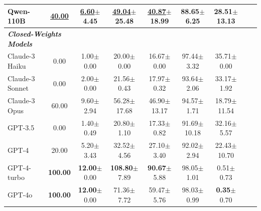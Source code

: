 \documentclass{article}
\begin{document}
\begin{table}[h]
\begin{tabular}{lcccccccc}
Qwen-110B & \underline{40.00} & \underline{6.60}\tiny{$\pm$4.45} & \underline{49.04}\tiny{$\pm$25.48} & \underline{40.87}\tiny{$\pm$18.99} & 88.65\tiny{$\pm$6.25} & 28.51\tiny{$\pm$13.13} \\
\midrule
\multicolumn{2}{l}{\textbf{\textit{Closed-Weights Models}}} & \\
Claude-3 Haiku & 0.00 & 1.00\tiny{$\pm$0.00} & 20.00\tiny{$\pm$0.00} & 16.67\tiny{$\pm$0.00} & 97.44\tiny{$\pm$3.32} & 35.71\tiny{$\pm$0.00} \\
Claude-3 Sonnet & 0.00 & 2.00\tiny{$\pm$0.00} & 21.56\tiny{$\pm$0.43} & 17.97\tiny{$\pm$0.32} & 93.64\tiny{$\pm$2.06} & 33.17\tiny{$\pm$1.92} \\
Claude-3 Opus & 60.00 & 9.60\tiny{$\pm$2.94} & 56.28\tiny{$\pm$17.68} & 46.90\tiny{$\pm$13.17} & 94.57\tiny{$\pm$1.71} & 18.79\tiny{$\pm$11.54} \\
GPT-3.5 & 0.00 & 1.40\tiny{$\pm$0.49} & 20.80\tiny{$\pm$1.10} & 17.33\tiny{$\pm$0.82} & 91.69\tiny{$\pm$10.18} & 32.16\tiny{$\pm$5.57} \\
GPT-4 & 20.00 & 5.20\tiny{$\pm$3.43} & 32.52\tiny{$\pm$4.56} & 27.10\tiny{$\pm$3.40} & 92.02\tiny{$\pm$2.94} & 22.43\tiny{$\pm$10.70} \\
GPT-4-turbo & \textbf{100.00} & \textbf{12.00}\tiny{$\pm$0.00} & \textbf{108.80}\tiny{$\pm$7.89} & \textbf{90.67}\tiny{$\pm$5.88} & 98.05\tiny{$\pm$1.01} & 0.51\tiny{$\pm$0.73} \\
GPT-4o & \textbf{100.00} & \textbf{12.00}\tiny{$\pm$0.00} & 71.36\tiny{$\pm$7.72} & 59.47\tiny{$\pm$5.76} & 98.03\tiny{$\pm$0.99} & \textbf{0.35}\tiny{$\pm$0.70} \\
\bottomrule
\end{tabular}

\end{table}

\clearpage
\end{document}
